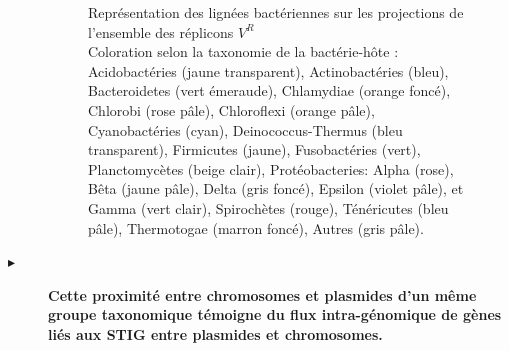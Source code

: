 \begin{description}
\begin{figure}[H]
\begin{minipage}{0.50\textwidth}
	\label{figMDS2}
	\end{minipage}
	\caption[Identification des lignées bactériennes sur la projection des réplicons]{Représentation des lignées bactériennes sur les projections de l’ensemble des réplicons $V^{R}$ \\\medskip  Coloration selon la taxonomie de la bactérie-hôte : Acidobactéries (jaune transparent), Actinobactéries (bleu), Bacteroidetes (vert émeraude), Chlamydiae (orange foncé), Chlorobi (rose pâle), Chloroflexi (orange pâle), Cyanobactéries (cyan), Deinococcus-Thermus (bleu transparent), Firmicutes (jaune), Fusobactéries (vert), Planctomycètes (beige clair), Protéobacteries: Alpha (rose), Bêta (jaune pâle), Delta (gris foncé), Epsilon (violet pâle), et Gamma (vert clair), Spirochètes (rouge), Ténéricutes (bleu pâle), Thermotogae (marron foncé), Autres (gris pâle).}
\end{figure}  

\item[$\blacktriangleright$] \textbf{Cette proximité entre chromosomes et plasmides d'un même groupe taxonomique témoigne du flux intra-génomique de gènes liés aux STIG entre plasmides et chromosomes.}
\end{description}   

